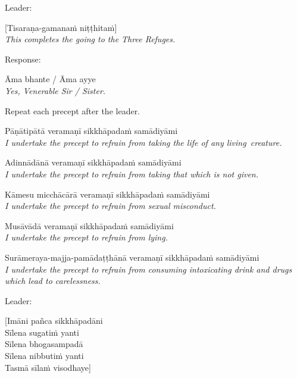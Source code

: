 \begin{instruction}
  Leader:
\end{instruction}

[Tisaraṇa-gamanaṁ niṭṭhitaṁ]\\
\emph{This completes the going to the Three Refuges.}

\begin{instruction}
  Response:
\end{instruction}

Āma bhante / Āma ayye\\
\emph{Yes, Venerable Sir / Sister.}

\begin{instruction}
  Repeat each precept after the leader.
\end{instruction}

{\raggedright

\begin{packedenumerate}
  \item Pāṇātipātā veramaṇī sikkhāpadaṁ samādiyāmi\\
    \emph{I undertake the precept to refrain from taking the life of any living~creature.}
  \item Adinnādānā veramaṇī sikkhāpadaṁ samādiyāmi\\
    \emph{I undertake the precept to refrain from taking that which is not given.}
  \item Kāmesu micchācārā veramaṇī sikkhāpadaṁ samādiyāmi\\
    \emph{I undertake the precept to refrain from sexual misconduct.}
  \item Musāvādā veramaṇī sikkhāpadaṁ samādiyāmi\\
    \emph{I undertake the precept to refrain from lying.}
  \item Surāmeraya-majja-pamādaṭṭhānā veramaṇī sikkhāpadaṁ samādiyāmi\\
    \emph{I undertake the precept to refrain from consuming intoxicating drink and drugs which lead to carelessness.}
\end{packedenumerate}

}

\begin{instruction}
  Leader:
\end{instruction}

[Imāni pañca sikkhāpadāni\\
Sīlena sugatiṁ yanti\\
Sīlena bhogasampadā\\
Sīlena nibbutiṁ yanti\\
Tasmā sīlaṁ visodhaye]


